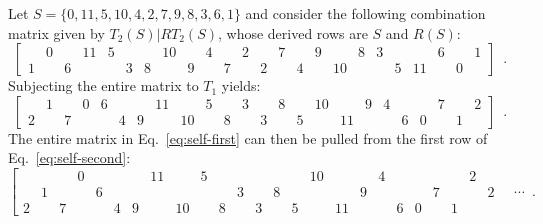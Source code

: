 \begin{example}
    \cite[221]{Starr1984}
    \label{self-folded}
    Let $S = \{ 0, 11, 5, 10, 4, 2, 7, 9, 8, 3, 6, 1 \}$ and consider the following combination matrix given by $T_2(S) | RT_2(S)$, whose derived rows are $S$ and $R(S)$:
    \begin{equation}
        \label{eq:self-first}
        \left[
        \begin{array}{cccccccccccc|cccccccccccc}
            & 0 && 11 & 5 &&& 10 && 4 && 2 && 7 && 9 && 8 & 3 &&& 6 && 1 \\
            1 && 6 &&& 3 & 8 && 9 && 7 && 2 && 4 && 10 &&& 5 & 11 && 0 &
        \end{array}
        \right] \enspace.
    \end{equation}
    Subjecting the entire matrix to $T_1$ yields:
    \begin{equation}
        \label{eq:self-second}
        \left[
        \begin{array}{cccccccccccc|cccccccccccc}
            & 1 && 0 & 6 &&& 11 && 5 && 3 && 8 && 10 && 9 & 4 &&& 7 && 2 \\
            2 && 7 &&& 4 & 9 && 10 && 8 && 3 && 5 && 11 &&& 6 & 0 && 1 &
        \end{array}
        \right] \enspace.
    \end{equation}
    The entire matrix in Eq.~\ref{eq:self-first} can then be pulled from the first row of Eq.~\ref{eq:self-second}:
    \begin{equation}
    	\label{eq:self-third}
        \left[
        \begin{array}{cccccccccccc|cccccccccccc|c}
            &&& 0 &&&& 11 && 5 &&&&&& 10 &&& 4 &&&&& 2 & \\
            & 1 &&& 6 &&&&&&& 3 && 8 &&&& 9 &&&& 7 &&& 2 \\
            2 && 7 &&& 4 & 9 && 10 && 8 && 3 && 5 && 11 &&& 6 & 0 && 1 &&
        \end{array}
        \quad \cdots \right. \enspace.
    \end{equation}
\end{example}

